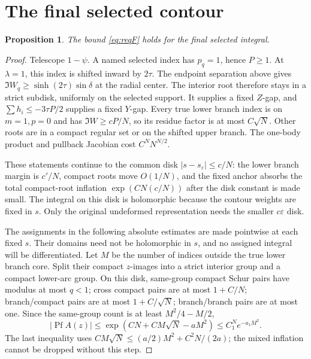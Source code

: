 \documentclass[11pt]{article}
\numberwithin{equation}{section}
\newtheorem{proposition}[theorem]{Proposition}
\theoremstyle{definition}
\newcommand{\eps}{\varepsilon}
\newcommand{\Pf}{\operatorname{Pf}}
\newcommand{\se}{s_\varepsilon}
\begin{document}
\section{The final selected contour}
\label{sec:F}
\begin{proposition}\label{prop:F}
The bound \eqref{eq:reqF} holds for the final selected integral.
\end{proposition}
\begin{proof}
Telescope \(1-\psi\). A named selected index has \(p_q=1\), hence \(P\ge1\).
At \(\lambda=1\), this index is shifted inward by \(2\tau\).
The endpoint separation above gives
\(\Im W_q\ge\sinh(2\tau)\sin\delta\) at the radial center.
The interior root therefore stays in a strict subdisk, uniformly
on the selected support. It supplies a fixed \(Z\)-gap, and
\(\sum h_i\le-3\tau P/2\) supplies a fixed \(Y\)-gap.
Every true lower branch index is on \(m=1,p=0\) and has
\(\Im W\ge cP/N\), so its residue factor is at most \(C\sqrt N\).
Other roots are in a compact regular set or on the shifted upper
branch. The one-body product and pullback Jacobian cost
\(C^N N^{N/2}\).

These statements continue to the common disk \(|s-\se|\le c/N\):
the lower branch margin is \(c'/N\), compact roots move \(O(1/N)\),
and the fixed anchor absorbs the total compact-root inflation
\(\exp(CN(c/N))\) after the disk constant is made small.
The integral on this disk is holomorphic because the contour weights
are fixed in \(s\). Only the original undeformed representation needs
the smaller \(c\eps\) disk.

The assignments in the following absolute estimates are made
pointwise at each fixed \(s\). Their domains need not be holomorphic
in \(s\), and no assigned integral will be differentiated.
Let \(M\) be the number of indices outside the true lower branch core.
Split their compact \(z\)-images into a strict interior group and a
compact lower-arc group. On this disk, same-group compact Schur
pairs have modulus at most \(q<1\); cross compact pairs are at most
\(1+C/N\); branch/compact pairs are at most \(1+C/\sqrt N\);
branch/branch pairs are at most one.
Since the same-group count is at least \(M^2/4-M/2\),
\[
 |\Pf A(z)|\le
 \exp(CN+CM\sqrt N-aM^2)\le C_1^N e^{-a_1M^2}.
\]
The last inequality uses
\(CM\sqrt N\le(a/2)M^2+C^2N/(2a)\); the mixed inflation cannot be
dropped without this step.


\end{proof}
\end{document}
